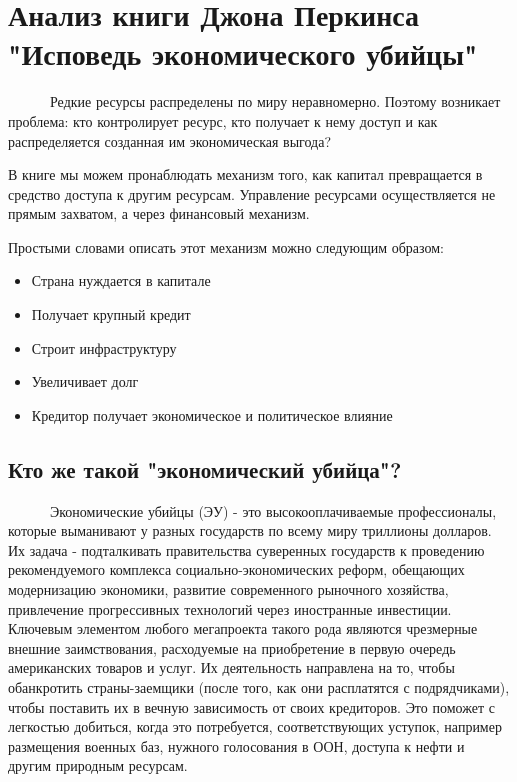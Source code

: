 \documentclass[12pt]{article}
\begin{document}
\section{Анализ книги Джона Перкинса\\ "Исповедь экономического убийцы"}
\ \ \ \ \ \ Редкие ресурсы распределены по миру неравномерно. Поэтому возникает проблема: кто контролирует ресурс, кто получает к нему доступ и как распределяется созданная им экономическая выгода?

В книге мы можем пронаблюдать механизм того, как капитал превращается в средство доступа к другим ресурсам. Управление ресурсами осуществляется не прямым захватом, а через финансовый механизм.

Простыми словами описать этот механизм можно следующим образом:
\begin{itemize}
    \item Страна нуждается в капитале
    \item Получает крупный кредит
    \item Строит инфраструктуру
    \item Увеличивает долг
    \item Кредитор получает экономическое и политическое влияние
\end{itemize}

\subsection{Кто же такой "экономический убийца"?}
\ \ \ \ \ \ Экономические убийцы (ЭУ) - это высокооплачиваемые
профессионалы, которые выманивают у разных государств по всему миру триллионы долларов. Их задача - подталкивать правительства
суверенных государств к проведению рекомендуемого комплекса
социально-экономических реформ, обещающих модернизацию
экономики, развитие современного рыночного хозяйства, привлечение прогрессивных технологий через иностранные инвестиции. Ключевым элементом любого мегапроекта такого рода являются чрезмерные внешние заимствования, расходуемые на
приобретение в первую очередь американских товаров и услуг. Их деятельность направлена на то, чтобы
обанкротить страны-заемщики (после того, как они расплатятся с подрядчиками), чтобы поставить их в вечную зависимость от своих кредиторов. Это
поможет с легкостью добиться, когда это потребуется, соответствующих уступок, например размещения военных баз, нужного голосования в ООН, доступа к нефти и другим природным ресурсам.
\end{document}
